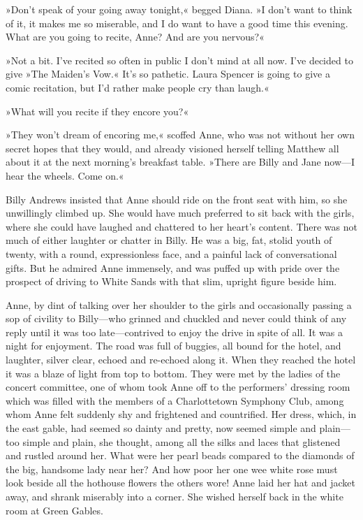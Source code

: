 »Don't speak of your going away tonight,« begged Diana. »I don't want to think of it, it makes me so miserable, and I do want to have a good time this evening. What are you going to recite, Anne? And are you nervous?«

»Not a bit. I've recited so often in public I don't mind at all now. I've decided to give »The Maiden's Vow.« It's so pathetic. Laura Spencer is going to give a comic recitation, but I'd rather make people cry than laugh.«

»What will you recite if they encore you?«

»They won't dream of encoring me,« scoffed Anne, who was not without her own secret hopes that they would, and already visioned herself telling Matthew all about it at the next morning's breakfast table. »There are Billy and Jane now—I hear the wheels. Come on.«

Billy Andrews insisted that Anne should ride on the front seat with him, so she unwillingly climbed up. She would have much preferred to sit back with the girls, where she could have laughed and chattered to her heart's content. There was not much of either laughter or chatter in Billy. He was a big, fat, stolid youth of twenty, with a round, expressionless face, and a painful lack of conversational gifts. But he admired Anne immensely, and was puffed up with pride over the prospect of driving to White Sands with that slim, upright figure beside him.

Anne, by dint of talking over her shoulder to the girls and occasionally passing a sop of civility to Billy—who grinned and chuckled and never could think of any reply until it was too late—contrived to enjoy the drive in spite of all. It was a night for enjoyment. The road was full of buggies, all bound for the hotel, and laughter, silver clear, echoed and re-echoed along it. When they reached the hotel it was a blaze of light from top to bottom. They were met by the ladies of the concert committee, one of whom took Anne off to the performers' dressing room which was filled with the members of a Charlottetown Symphony Club, among whom Anne felt suddenly shy and frightened and countrified. Her dress, which, in the east gable, had seemed so dainty and pretty, now seemed simple and plain—too simple and plain, she thought, among all the silks and laces that glistened and rustled around her. What were her pearl beads compared to the diamonds of the big, handsome lady near her? And how poor her one wee white rose must look beside all the hothouse flowers the others wore! Anne laid her hat and jacket away, and shrank miserably into a corner. She wished herself back in the white room at Green Gables.

